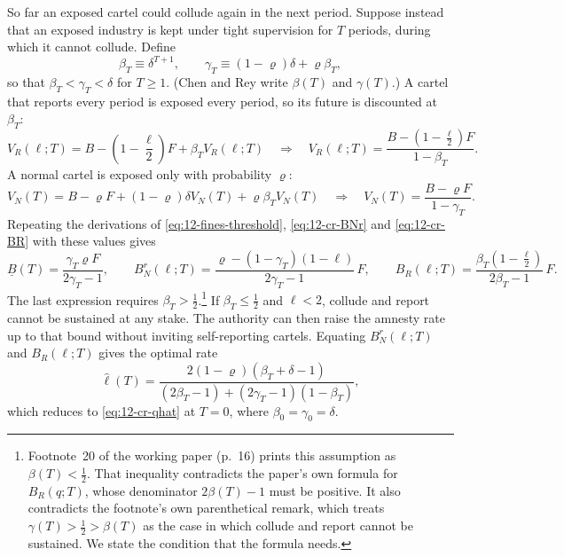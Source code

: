 So far an exposed cartel could collude again in the next period. Suppose instead that an exposed industry is kept
under tight supervision for $T$ periods, during which it cannot collude. Define
\begin{equation}\label{eq:12-cr-beta-gamma}
\beta_T \equiv \delta^{T+1}, \qquad \gamma_T \equiv (1-\varrho)\delta + \varrho\beta_T,
\end{equation}
so that $\beta_T < \gamma_T < \delta$ for $T \ge 1$. (Chen and Rey write $\beta(T)$ and $\gamma(T)$.) A cartel that
reports every period is exposed every period, so its future is discounted at $\beta_T$:
\begin{equation*}
V_R(\ell;T) = B - \left(1 - \frac{\ell}{2}\right)F + \beta_T V_R(\ell;T)
\quad\Longrightarrow\quad
V_R(\ell;T) = \frac{B - \left(1 - \frac{\ell}{2}\right)F}{1 - \beta_T}.
\end{equation*}
A normal cartel is exposed only with probability $\varrho$:
\begin{equation*}
V_N(T) = B - \varrho F + (1-\varrho)\delta V_N(T) + \varrho\beta_T V_N(T)
\quad\Longrightarrow\quad
V_N(T) = \frac{B - \varrho F}{1 - \gamma_T}.
\end{equation*}
Repeating the derivations of \eqref{eq:12-fines-threshold}, \eqref{eq:12-cr-BNr} and \eqref{eq:12-cr-BR} with these
values gives
\begin{equation}\label{eq:12-cr-scrutiny}
\underline B(T) = \frac{\gamma_T\varrho F}{2\gamma_T - 1},\qquad
B_N^r(\ell;T) = \frac{\varrho - (1-\gamma_T)(1-\ell)}{2\gamma_T - 1}\,F,\qquad
B_R(\ell;T) = \frac{\beta_T\left(1 - \frac{\ell}{2}\right)}{2\beta_T - 1}\,F.
\end{equation}
The last expression requires $\beta_T > \frac{1}{2}$.\footnote{Footnote~20 of the working paper (p.~16) prints this
assumption as $\beta(T) < \frac{1}{2}$. That inequality contradicts the paper's own formula for $B_R(q;T)$, whose
denominator $2\beta(T) - 1$ must be positive. It also contradicts the footnote's own parenthetical remark, which
treats $\gamma(T) > \frac{1}{2} > \beta(T)$ as the case in which collude and report cannot be sustained. We state the
condition that the formula needs.} If $\beta_T \le \frac{1}{2}$ and $\ell < 2$, collude and report
cannot be sustained at any stake. The authority can then raise the amnesty rate up to that bound without inviting
self-reporting cartels.
Equating $B_N^r(\ell;T)$ and $B_R(\ell;T)$ gives the optimal rate
\begin{equation}\label{eq:12-cr-qhatT}
\hat\ell(T) = \frac{2(1-\varrho)(\beta_T + \delta - 1)}{(2\beta_T - 1) + (2\gamma_T - 1)(1 - \beta_T)},
\end{equation}
which reduces to \eqref{eq:12-cr-qhat} at $T = 0$, where $\beta_0 = \gamma_0 = \delta$.

